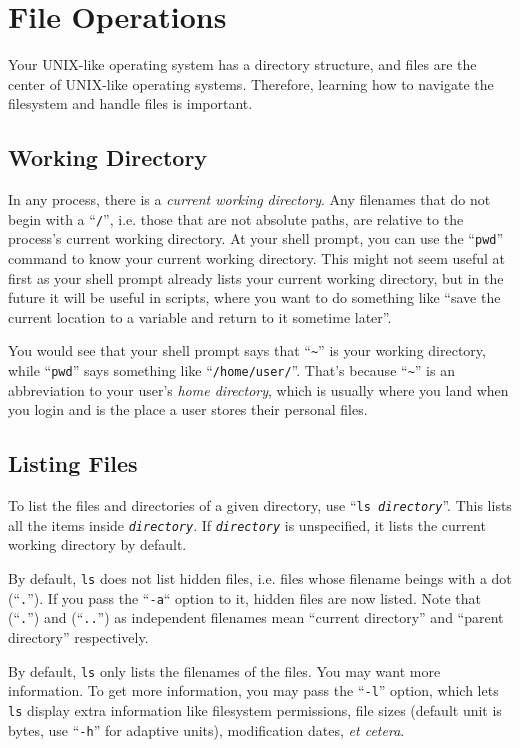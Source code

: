 \documentclass{extbook}
\newcommand\ph[1]{\texttt{\textit{#1}}}
\begin{document}
\section{File Operations}

Your UNIX-like operating system has a directory structure, and files are the center of UNIX-like operating systems.  Therefore, learning how to navigate the filesystem and handle files is important.

\subsection{Working Directory}

In any process, there is a \textit{current working directory}.  Any filenames that do not begin with a ``\verb|/|'', i.e. those that are not absolute paths, are relative to the process's current working directory.  At your shell prompt, you can use the ``\verb|pwd|'' command to know your current working directory.  This might not seem useful at first as your shell prompt already lists your current working directory, but in the future it will be useful in scripts, where you want to do something like ``save the current location to a variable and return to it sometime later''.

You would see that your shell prompt says that ``\verb|~|'' is your working directory, while ``\verb|pwd|'' says something like ``\verb|/home/user/|''.  That's because ``\verb|~|'' is an abbreviation to your user's \textit{home directory}, which is usually where you land when you login and is the place a user stores their personal files.

\subsection{Listing Files}

To list the files and directories of a given directory, use ``\texttt{ls \ph{directory}}''.  This lists all the items inside \ph{directory}.  If \ph{directory} is unspecified, it lists the current working directory by default.

By default, \verb|ls| does not list hidden files, i.e. files whose filename beings with a dot (``\verb|.|'').  If you pass the ``\verb|-a|`` option to it, hidden files are now listed.  Note that (``\verb|.|'') and (``\verb|..|'') as independent filenames mean ``current directory'' and ``parent directory'' respectively.

By default, \verb|ls| only lists the filenames of the files.  You may want more information.  To get more information, you may pass the ``\verb|-l|'' option, which lets \verb|ls| display extra information like filesystem permissions, file sizes (default unit is bytes, use ``\verb|-h|'' for adaptive units), modification dates, \textit{et cetera}.
\end{document}
